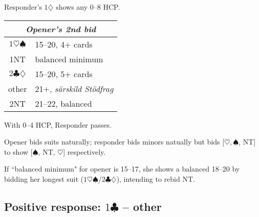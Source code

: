 \documentclass[a4paper, twoside, 11pt]{article}
\begin{document}
\begin{multicols}{3}
Responder's $1\diamondsuit$ shows any 0--8 HCP.

\begin{center}
\begin{tabular}{ |c|l| }
 \hline
 \multicolumn{2}{|c|}{\textit{Opener's 2nd bid}} \\
 \hline
 $1\heartsuit\spadesuit$ & 15--20, 4+ cards\\
 \textnormal{1NT}& balanced minimum \\
 $2\clubsuit\diamondsuit$ & 15--20, 5+ cards\\
 other& 21+, \textit{särskild Stödfrag}\\
 \textnormal{2NT}& 21--22, balanced\\

 \hline
\end{tabular}
\end{center}

With 0--4 HCP, Responder passes.

Opener bids suits naturally; responder bids minors natually but bids [$\heartsuit, \spadesuit$, NT] to show [$\spadesuit$, NT, $\heartsuit$] respectively.

If ``balanced minimum" for opener is 15--17, she shows a balanced 18--20 by bidding her longest suit ($1\heartsuit\spadesuit$/$2\clubsuit\diamondsuit$), intending to rebid NT.\\





\subsection*{Positive response: $1\clubsuit$ -- other}


\end{multicols}
\end{document}
